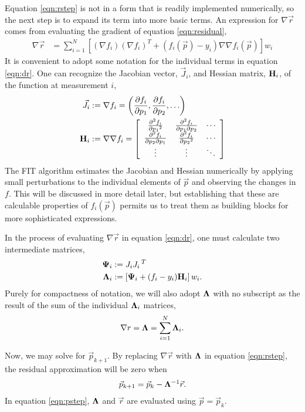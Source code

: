 \documentclass{article}
\def\p{\vec{p}}
\def\r{\vec{r}}
\def\J{\vec{J}}
\def\H{{\bf H}}
\def\LAM{{\bf \Lambda}}
\def\PSI{{\bf \Psi}}
\begin{document}
Equation \ref{eqn:rstep} is not in a form that is readily implemented numerically, so the next step is to expand its term into more basic terms.  An expression for $\nabla \r$ comes from evaluating the gradient of equation \ref{eqn:residual},
\begin{align}
\nabla \r &= \sum_{i=1}^N \left[(\nabla f_i)(\nabla f_i)^T + (f_i(\p) - y_i) \nabla\nabla f_i(\p)\right] w_i\label{eqn:dr}
\end{align}
It is convenient to adopt some notation for the individual terms in equation \ref{eqn:dr}.  One can recognize the Jacobian vector, $\J_i$, and Hessian matrix, $\H_i$, of the function at measurement $i$,
\def\arraystretch{2}
\begin{align}
\J_i &:= \nabla f_i = \left(\frac{\partial f_i}{\partial p_1}, \frac{\partial f_i}{\partial p_2}, \ldots \right)\\
\H_i &:= \nabla \nabla f_i =\left[ 
\begin{array}{ccc}
\frac{\partial^2 f_i}{\partial p_1{^2}} & \frac{\partial^2 f_i}{\partial p_1 \partial p_2} & \cdots \\
\frac{\partial^2 f_i}{\partial p_2 \partial p_1} & \frac{\partial^2 f_i}{\partial p_2{^2}} & \cdots \\
\vdots & \vdots & \ddots
\end{array}
\right]
\end{align}
The FIT algorithm estimates the Jacobian and Hessian numerically by applying small perturbations to the individual elements of $\p$ and observing the changes in $f$.  This will be discussed in more detail later, but establishing that these are calculable properties of $f_i(\p)$ permits us to treat them as building blocks for more sophisticated expressions.

In the process of evaluating $\nabla \r$ in equation \ref{eqn:dr}, one must calculate two intermediate matrices,
\begin{align}
\PSI_i &:= J_i J_i\,^T\\
\LAM_i &:= \left[\PSI_i + (f_i - y_i) \H_i\right]w_i.\\
\end{align}
Purely for compactness of notation, we will also adopt $\LAM$ with no subscript as the result of the sum of the individual $\LAM_i$ matrices,
\begin{align}
\nabla r = \LAM = \sum_{i=1}^N \LAM_i.
\end{align}

Now, we may solve for $\p_{k+1}$.  By replacing $\nabla \r$ with $\LAM$ in equation \ref{eqn:rstep}, the residual approximation will be zero when
\begin{align}
\p_{k+1} = \p_k - \LAM^{-1} \r.\label{eqn:pstep}
\end{align}
In equation \ref{eqn:pstep}, $\LAM$ and $\r$ are evaluated using $\p=\p_k$.
\end{document}
